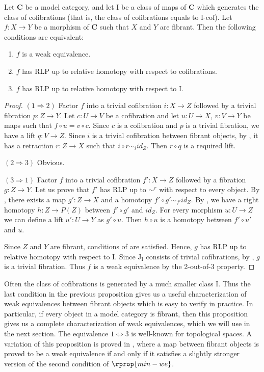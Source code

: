 \documentclass{tac}
\theoremstyle{definition}
\newcommand{\cat}[1]{\mathbf{#1}}
\newcommand{\C}{\cat{C}}
\newcommand{\I}{\mathrm{I}}
\newcommand{\J}{\mathrm{J}}
\newcommand{\class}[2]{#1\text{-}\mathrm{#2}}
\newcommand{\Icof}[1][\I]{\class{#1}{cof}}
\begin{document}
\begin{prop}[min-we]
Let $\C$ be a model category, and let $\I$ be a class of maps of $\C$ which generates the class of cofibrations (that is, the class of cofibrations equals to $\Icof$).
Let $f : X \to Y$ be a morphism of $\C$ such that $X$ and $Y$ are fibrant.
Then the following conditions are equivalent:
\begin{enumerate}
\item $f$ is a weak equivalence.
\item $f$ has RLP up to relative homotopy with respect to cofibrations.
\item $f$ has RLP up to relative homotopy with respect to $\I$.
\end{enumerate}
\end{prop}
\begin{proof}
$(1 \Rightarrow 2)$
Factor $f$ into a trivial cofibration $i : X \to Z$ followed by a trivial fibration $p : Z \to Y$.
Let $c : U \to V$ be a cofibration and let $u : U \to X$, $v : V \to Y$ be maps such that $f \circ u = v \circ c$.
Since $c$ is a cofibration and $p$ is a trivial fibration, we have a lift $q : V \to Z$.
Since $i$ is a trivial cofibration between fibrant objects, by , it has a retraction $r : Z \to X$ such that $i \circ r \sim_i id_Z$.
Then $r \circ q$ is a required lift.

$(2 \Rightarrow 3)$ Obvious.

$(3 \Rightarrow 1)$
Factor $f$ into a trivial cofibration $f' : X \to Z$ followed by a fibration $g : Z \to Y$.
Let us prove that $f'$ has RLP up to $\sim^r$ with respect to every object.
By , there exists a map $g' : Z \to X$ and a homotopy $f' \circ g' \sim_{f'} id_Z$.
By , we have a right homotopy $h : Z \to P(Z)$ between $f' \circ g'$ and $id_Z$.
For every morphism $u : U \to Z$ we can define a lift $u' : U \to Y$ as $g' \circ u$.
Then $h \circ u$ is a homotopy between $f' \circ u'$ and $u$.

Since $Z$ and $Y$ are fibrant, conditions of  are satisfied.
Hence, $g$ has RLP up to relative homotopy with respect to $\I$.
Since $\J_\I$ consists of trivial cofibrations, by , $g$ is a trivial fibration.
Thus $f$ is a weak equivalence by the 2-out-of-3 property.
\end{proof}

Often the class of cofibrations is generated by a much smaller class $\I$.
Thus the last condition in the previous proposition gives us a useful characterization of weak equivalences between fibrant objects which is easy to verify in practice.
In particular, if every object in a model category is fibrant, then this proposition gives us a complete characterization of weak equivalences, which we will use in the next section.
The equivalence $1 \Leftrightarrow 3$ is well-known for topological spaces.
A variation of this proposition is proved in \cite{vogt-we},
where a map between fibrant objects is proved to be a weak equivalence if and only if it satisfies a slightly stronger version of the second condition of $\rprop{min-we}$.
\end{document}
